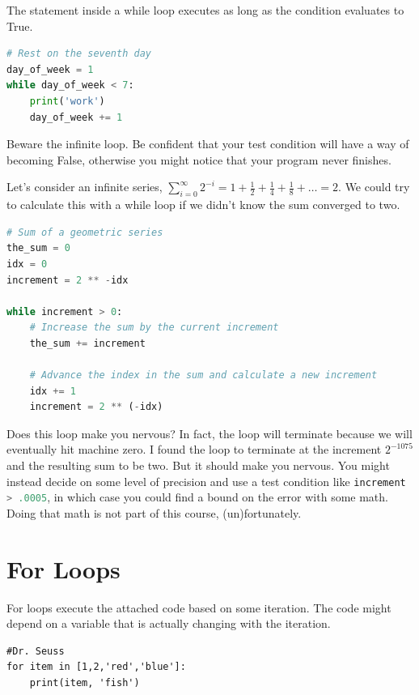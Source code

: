\noindent The statement inside a while loop executes as long as the condition evaluates to True.

\begin{lstlisting}[language = Python]
# Rest on the seventh day
day_of_week = 1
while day_of_week < 7:
    print('work')
    day_of_week += 1 \end{lstlisting}


\smallskip
\noindent Beware the infinite loop. Be confident that your test condition will have a way of becoming False, otherwise
you might notice that your program never finishes. 

\smallskip

\noindent Let's consider an infinite series, $\sum_{i=0}^\infty 2^{-i} =  1 + \frac{1}{2} + \frac{1}{4} + \frac{1}{8} + \dots = 2$.
We could try to calculate this with a while loop if we didn't know the sum converged to two.

\begin{lstlisting}[language = Python]
# Sum of a geometric series
the_sum = 0
idx = 0
increment = 2 ** -idx

while increment > 0:
    # Increase the sum by the current increment
    the_sum += increment
    
    # Advance the index in the sum and calculate a new increment
    idx += 1
    increment = 2 ** (-idx) \end{lstlisting}
    
\smallskip

\noindent Does this loop make you nervous? In fact, the loop will terminate because we will eventually hit machine zero.
I found the loop to terminate at the increment $2^{-1075}$ and the resulting sum to be two. But it should make you nervous.
You might instead decide on some level of precision and use a test condition like 
\lstinline[language=Python]{increment > .0005}, in which case you could find a bound on the error with some math.
Doing that math is not part of this course, (un)fortunately.


\section{For Loops} 
\label{sec:forloop}

For loops execute the attached code based on some iteration. The code might depend on a variable that is actually changing
with the iteration. 

\begin{lstlisting}
#Dr. Seuss
for item in [1,2,'red','blue']:
    print(item, 'fish')  
\end{lstlisting}

